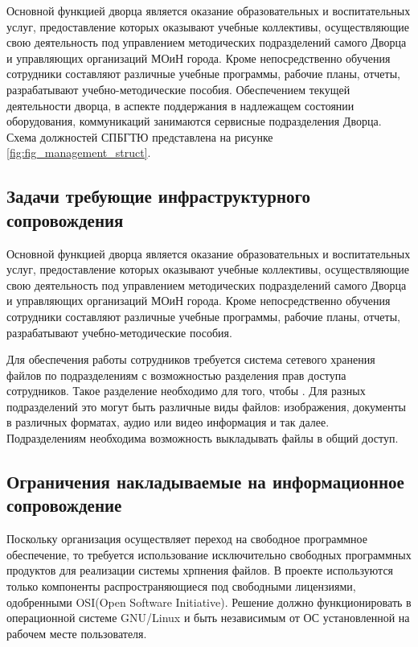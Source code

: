 \documentclass[utf8,usehyperref,12pt]{G7-32}
\begin{document}
Основной функцией дворца является оказание образовательных и воспитательных услуг, предоставление которых оказывают учебные коллективы, осуществляющие свою деятельность под управлением методических подразделений самого Дворца
и управляющих организаций МОиН города. Кроме непосредственно обучения сотрудники  составляют различные учебные программы, рабочие планы, отчеты, разрабатывают учебно-методические пособия.
Обеспечением текущей деятельности дворца, в аспекте поддержания в надлежащем состоянии оборудования, коммуникаций занимаются сервисные подразделения Дворца. Схема должностей СПБГТЮ представлена на рисунке \ref{fig:fig_management_struct}.

\subsection{Задачи требующие инфраструктурного сопровождения}\label{ssect:tasks_infra}
Основной функцией дворца является оказание образовательных и воспитательных услуг, предоставление которых оказывают учебные коллективы, осуществляющие свою деятельность под управлением методических подразделений самого Дворца
и управляющих организаций МОиН города. Кроме непосредственно обучения сотрудники составляют различные учебные программы, рабочие планы, отчеты, разрабатывают учебно-методические пособия. 

Для обеспечения работы сотрудников требуется система сетевого хранения файлов по подразделениям с возможностью разделения прав доступа сотрудников. Такое разделение необходимо для того, чтобы . Для разных подразделений это могут быть различные виды файлов: изображения, документы в различных форматах, аудио или видео информация и так далее. Подразделениям необходима возможность выкладывать файлы в общий доступ.

\subsection{Ограничения накладываемые на информационное сопровождение}\label{ssect:restrict_infra}
Поскольку организация осуществляет переход на свободное программное обеспечение, то требуется использование исключительно свободных программных продуктов для реализации системы хрпнения файлов. В проекте используются только компоненты распространяющиеся под свободными лицензиями, одобренными OSI(Open Software Initiative). Решение должно функционировать в операционной системе GNU/Linux и быть независимым от ОС установленной на рабочем месте пользователя.
\end{document}

